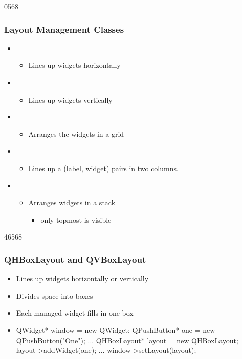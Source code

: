 \begin{slide}{0568}\frametitle{Layout Management Classes}
\begin{itemize} 
\item {} 
  \begin{itemize}
  \item Lines up widgets horizontally 
  \end{itemize}
\item {}
  \begin{itemize}
  \item Lines up widgets vertically
  \end{itemize}
\item {} 
  \begin{itemize}
  \item Arranges the widgets in a grid
  \end{itemize}
\item {} 
  \begin{itemize}
  \item Lines up a (label, widget) pairs in two columns.
  \end{itemize}
\item {} 
  \begin{itemize}
  \item Arranges widgets in a stack
    \begin{itemize}
	    \item only topmost is visible
  \end{itemize}
\end{itemize}
\end{itemize}
\end{slide}


\begin{slide}[fragile]{46568}
  \frametitle{QHBoxLayout and QVBoxLayout}
  \begin{itemize}
  \item Lines up widgets horizontally or vertically
  \item Divides space into boxes
  \item Each managed widget fills in one box
  \end{itemize}
  \begin{itemize}
  \item[] \begin{cpp}
QWidget* window = new QWidget;
QPushButton* one = new QPushButton("One");
...
QHBoxLayout* layout = new QHBoxLayout;
layout->addWidget(one);
...
window->setLayout(layout);
  \end{cpp}               
  \end{itemize}
\end{slide}

